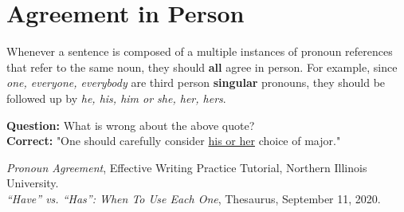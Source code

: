 \documentclass[12pt]{article} %
\begin{document}
\section{Agreement in Person}
Whenever a sentence is composed of a multiple instances of pronoun references that refer to the same noun, they should \textbf{all} agree in person. For example, since 
\textit{one, everyone, everybody} are third person \textbf{singular} pronouns, they should be followed up by \textit{he, his, him or she, her, hers}.



\textbf{Question: }What is wrong about the above quote?\\
\textbf{Correct: }"One should carefully consider \underline{his or her} choice of major."



\textit{Pronoun Agreement}, Effective Writing Practice Tutorial, Northern Illinois University.\\
\textit{“Have” vs. “Has”: When To Use Each One}, Thesaurus, September 11, 2020. 


  
\end{document}
